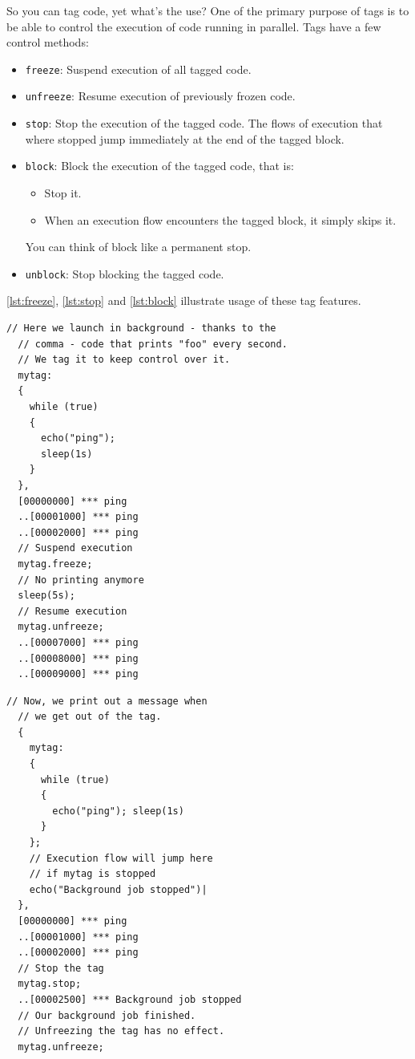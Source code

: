 \documentclass[openright,twoside,12pt]{report}
\newcommand{\lst}[1]{\autoref{lst:#1}}
\begin{document}
So you can tag code, yet what's the use? One of the primary purpose of
tags is to be able to control the execution of code running in
parallel. Tags have a few control methods:

\begin{itemize}
\item \texttt{freeze}: Suspend execution of all tagged code.
\item \texttt{unfreeze}: Resume execution of previously frozen code.
\item \texttt{stop}: Stop the execution of the tagged code. The flows
  of execution that where stopped jump immediately at the end of the
  tagged block.
\item \texttt{block}: Block the execution of the tagged code, that is:
  \begin{itemize}
  \item Stop it.
  \item When an execution flow encounters the tagged block, it simply
    skips it.
  \end{itemize}
  You can think of block like a permanent stop.
\item \texttt{unblock}: Stop blocking the tagged code.
\end{itemize}

\lst{freeze}, \lst{stop} and \lst{block} illustrate usage of these tag
features.

\begin{lstlisting}[caption=Freezing/unfreezing code execution, label=lst:freeze]
  // Here we launch in background - thanks to the
  // comma - code that prints "foo" every second.
  // We tag it to keep control over it.
  mytag:
  {
    while (true)
    {
      echo("ping");
      sleep(1s)
    }
  },
  [00000000] *** ping
  ..[00001000] *** ping
  ..[00002000] *** ping
  // Suspend execution
  mytag.freeze;
  // No printing anymore
  sleep(5s);
  // Resume execution
  mytag.unfreeze;
  ..[00007000] *** ping
  ..[00008000] *** ping
  ..[00009000] *** ping
\end{lstlisting}

\begin{lstlisting}[caption=Stopping code execution, label=lst:stop]
  // Now, we print out a message when
  // we get out of the tag.
  {
    mytag:
    {
      while (true)
      {
        echo("ping"); sleep(1s)
      }
    };
    // Execution flow will jump here
    // if mytag is stopped
    echo("Background job stopped")|
  },
  [00000000] *** ping
  ..[00001000] *** ping
  ..[00002000] *** ping
  // Stop the tag
  mytag.stop;
  ..[00002500] *** Background job stopped
  // Our background job finished.
  // Unfreezing the tag has no effect.
  mytag.unfreeze;
\end{lstlisting}
\end{document}
